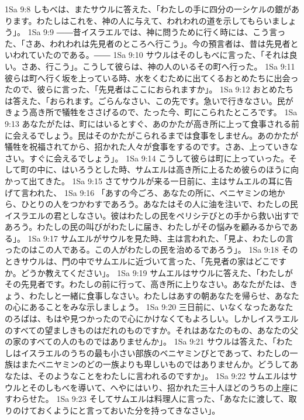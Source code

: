 1Sa 9:8  しもべは、またサウルに答えた、「わたしの手に四分の一シケルの銀があります。わたしはこれを、神の人に与えて、われわれの道を示してもらいましょう」。
1Sa 9:9  ――昔イスラエルでは、神に問うために行く時には、こう言った、「さあ、われわれは先見者のところへ行こう」。今の預言者は、昔は先見者といわれていたのである。――
1Sa 9:10  サウルはそのしもべに言った、「それは良い。さあ、行こう」。こうして彼らは、神の人のいるその町へ行った。
1Sa 9:11  彼らは町へ行く坂を上っている時、水をくむために出てくるおとめたちに出会ったので、彼らに言った、「先見者はここにおられますか」。
1Sa 9:12  おとめたちは答えた、「おられます。ごらんなさい、この先です。急いで行きなさい。民がきょう高き所で犠牲をささげるので、たった今、町にこられたところです。
1Sa 9:13  あなたがたは、町にはいるとすぐ、あのかたが高き所に上って食事される前に会えるでしょう。民はそのかたがこられるまでは食事をしません。あのかたが犠牲を祝福されてから、招かれた人々が食事をするのです。さあ、上っていきなさい。すぐに会えるでしょう」。
1Sa 9:14  こうして彼らは町に上っていった。そして町の中に、はいろうとした時、サムエルは高き所に上るため彼らのほうに向かって出てきた。
1Sa 9:15  さてサウルが来る一日前に、主はサムエルの耳に告げて言われた、
1Sa 9:16  「あすの今ごろ、あなたの所に、ベニヤミンの地から、ひとりの人をつかわすであろう。あなたはその人に油を注いで、わたしの民イスラエルの君としなさい。彼はわたしの民をペリシテびとの手から救い出すであろう。わたしの民の叫びがわたしに届き、わたしがその悩みを顧みるからである」。
1Sa 9:17  サムエルがサウルを見た時、主は言われた、「見よ、わたしの言ったのはこの人である。この人がわたしの民を治めるであろう」。
1Sa 9:18  そのときサウルは、門の中でサムエルに近づいて言った、「先見者の家はどこですか。どうか教えてください」。
1Sa 9:19  サムエルはサウルに答えた、「わたしがその先見者です。わたしの前に行って、高き所に上りなさい。あなたがたは、きょう、わたしと一緒に食事しなさい。わたしはあすの朝あなたを帰らせ、あなたの心にあることをみな示しましょう。
1Sa 9:20  三日前に、いなくなったあなたのろばは、もはや見つかったので心にかけなくてもよろしい。しかしイスラエルのすべての望ましきものはだれのものですか。それはあなたのもの、あなたの父の家のすべての人のものではありませんか」。
1Sa 9:21  サウルは答えた、「わたしはイスラエルのうちの最も小さい部族のベニヤミンびとであって、わたしの一族はまたベニヤミンのどの一族よりも卑しいものではありませんか。どうしてあなたは、そのようなことをわたしに言われるのですか」。
1Sa 9:22  サムエルはサウルとそのしもべを導いて、へやにはいり、招かれた三十人ほどのうちの上座にすわらせた。
1Sa 9:23  そしてサムエルは料理人に言った、「あなたに渡して、取りのけておくようにと言っておいた分を持ってきなさい」。
